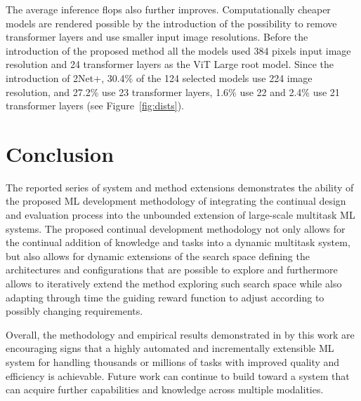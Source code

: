 \documentclass{article} \usepackage{iclr2023_conference,times}
\newcommand{\method}{2Net+\xspace}
\begin{document}
The average inference flops also further improves.
Computationally cheaper models are rendered possible by the introduction of the possibility to remove transformer layers and use smaller input image resolutions.
Before the introduction of the proposed method all the models used 384 pixels input image resolution and 24 transformer layers as the ViT Large root model.
Since the introduction of \method, 30.4\% of the 124 selected models use 224 image resolution, and 27.2\% use 23 transformer layers, 1.6\% use 22 and 2.4\% use 21 transformer layers (see Figure~\ref{fig:dists}).


\section{Conclusion}
\label{section:conclusions}

The reported series of system and method extensions demonstrates the ability of the proposed ML development methodology of integrating the continual design and evaluation process into the unbounded extension of large-scale multitask ML systems. 
The proposed continual development methodology not only allows for the continual addition of knowledge and tasks into a dynamic multitask system, but also allows for dynamic extensions of the search space defining the architectures and configurations that are possible to explore and furthermore allows to iteratively extend the method exploring such search space while also adapting through time the guiding reward function to adjust according to possibly changing requirements.

Overall, the methodology and empirical results demonstrated in by this work are encouraging signs that a highly automated and
incrementally extensible ML system for handling thousands or millions of tasks with improved quality and efficiency is achievable.
Future work can continue to build toward a system that can acquire further capabilities and knowledge across multiple modalities.

\clearpage













\clearpage
\appendix
\end{document}
